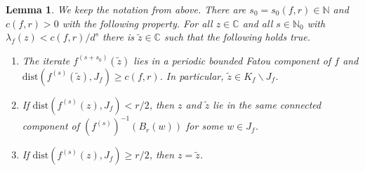 \documentclass[12pt,oneside,a4]{amsart}
\newcommand{\IC}{\mathbb{C}}
\newcommand{\IN}{\mathbb{N}}
\newcounter{maincounter}
\numberwithin{maincounter}{section}
\numberwithin{equation}{section}
\newtheorem{lemma}[maincounter]{Lemma}
\newcommand{\ssm}{\smallsetminus}
\begin{document}
\begin{lemma}
  \label{lem:quill}
  We keep the notation from above. There are
  $s_0=s_0(f,r)\in\IN$ and  $c(f,r)>0$
  with the following property. For all $z\in \IC$ and all $s\in\IN_0$ with
  $\lambda_f(z)<c(f,r)/d^s$ there is $\tilde z\in \IC$ such that the
  following holds true.
  \begin{enumerate}
  \item [(i)]  The iterate  $f^{(s+s_0)}(\tilde z)$ lies in a periodic bounded Fatou component of
   $f$ and $\mathrm{dist}(f^{(s)}(\tilde z),J_f)\ge c(f,r)$.
   In particular, $\tilde z\in K_f\ssm J_f$.
  \item[(ii)]   If $\mathrm{dist}(f^{(s)}(z),J_f)<r/2$, then  $z$
    and $\tilde z$ lie in the same
    connected component  of $(f^{(s)})^{-1}(B_{r}(w))$
    for some $w\in J_f$.
  \item[(iii)]   If $\mathrm{dist}(f^{(s)}(z),J_f)\ge r/2$,
    then $z=\tilde z$.
  \end{enumerate}
\end{lemma}
\end{document}
